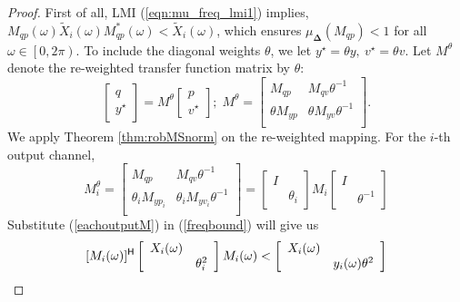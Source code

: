 \begin{proof}
First of all, LMI (\ref{eqn:mu_freq_lmi1}) implies, $M_{qp}(\omega)\tilde{X}_i(\omega)M_{qp}^*(\omega)<\tilde{X}_i(\omega)$, which ensures $\mu_{\bm{\Delta}}(M_{qp}) < 1$ for all \(\omega\in\left[0,2\pi\right)\).
To include the diagonal weights \(\theta\), we let \({y^{\star}}={\theta}{y},\ {v^{\star}}={\theta}{v}\). Let \(M^\theta\) denote the re-weighted transfer function matrix by \(\theta\):
\begin{equation}
\begin{bmatrix}
    q \\
    y^\star
\end{bmatrix}
= M^\theta 
\begin{bmatrix}
    p\\
    v^\star
\end{bmatrix}
;\;
M^\theta = \left[
    \begin{array}{cc}
        M_{qp}&M_{qv}\theta^{-1}\\
        \theta M_{yp} &\theta M_{yv}\theta^{-1}\\
    \end{array}\right].
\end{equation}
We apply Theorem \ref{thm:robMSnorm} on the re-weighted mapping. For the \(i\)-th output channel,
\begin{equation}\label{eachoutputM}
M_i^\theta = \left[
    \begin{array}{cc}
        M_{qp} & M_{qv}\theta^{-1}\\
        \theta_i M_{yp_i} &\theta_i M_{yv_i}\theta^{-1}\\
    \end{array}\right]
    = 
    \begin{bmatrix}
        I & \\
        & \theta_i
    \end{bmatrix}
    M_i 
    \begin{bmatrix}
        I & \\
        & \theta^{-1}
    \end{bmatrix}
\end{equation}
Substitute (\ref{eachoutputM}) in (\ref{freqbound}) will give us
\begin{equation}\label{freqbound_scale}
    [M_i(\omega)]^{\mathsf{H}}
    \left[
    \begin{array}{cc}
    X_i(\omega) &  \\
     & \theta_i^2
    \end{array}\right]
    M_i(\omega)
<\left[
\begin{array}{cc}
    X_i(\omega) &  \\
     & y_i(\omega)\theta^2
\end{array}\right]
\end{equation}


\end{proof}
